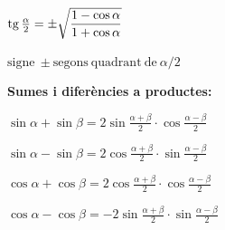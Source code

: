 \begin{bluebox}
\begin{minipage}{0.5\textwidth}
 \quad [16]\; $   \mathrm{tg}\,\frac{\alpha}{2} =\pm \sqrt{\dfrac{1-\cos \alpha}{1+\cos \alpha} } $ 
 
 \end{minipage}
\begin{minipage}{0.4\textwidth}
$\mathrm{signe\ \pm segons\ quadrant\ de\ } \alpha/2$ 
\end{minipage}

 
 
 
 
 \textbf{Sumes i diferències a  productes:}
 
 \quad [17]\; $  \sin \alpha+\sin \beta=2\sin \frac{\alpha+\beta}{2} \cdot \cos \frac{\alpha-\beta}{2} $ 
 
 \quad [18]\; $  \sin \alpha-\sin \beta=2\cos \frac{\alpha+\beta}{2} \cdot \sin \frac{\alpha-\beta}{2} $ 
 
 \quad [19]\; $  \cos \alpha+\cos \beta=2\cos \frac{\alpha+\beta}{2} \cdot \cos \frac{\alpha-\beta}{2} $ 
 
\quad [20]\; $  \cos \alpha-\cos \beta=-2\sin \frac{\alpha+\beta}{2} \cdot \sin \frac{\alpha-\beta}{2} $ 
 \end{bluebox}
 